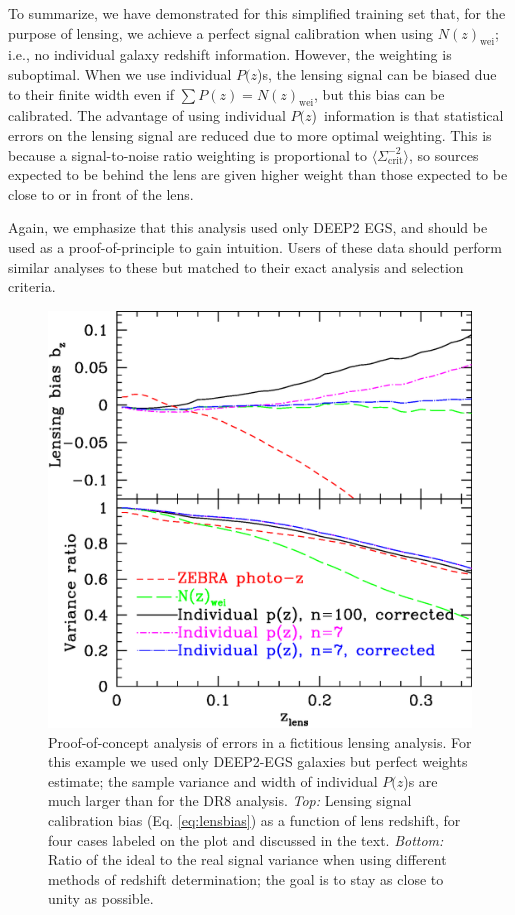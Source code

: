 \documentclass[12pt,preprint]{aastex}
\newcommand{\pofz}{$P(z$)}
\begin{document}
To summarize, we have demonstrated for this simplified training set that, for
the purpose of lensing, we achieve a perfect signal calibration when using
$N(z)_\mathrm{wei}$; i.e., no individual galaxy redshift information.  However,
the weighting is suboptimal.  When we use individual \pofz s, the lensing signal
can be biased due to their finite width even if $\sum P(z) =
N(z)_\mathrm{wei}$, but this bias can be calibrated.  The advantage of
using individual \pofz\ information is that statistical errors on the lensing
signal are reduced due to more optimal weighting.  This is because a
signal-to-noise ratio weighting is proportional to $\langle \Sigma_{\mathrm{crit}}^{-2}
\rangle$, so sources expected to be behind the lens are given higher weight
than those expected to be close to or in front of the lens.

Again, we emphasize that this analysis used only DEEP2 EGS, and should be used
as a proof-of-principle to gain intuition.  Users of these data should perform
similar analyses to these but matched to their exact analysis and selection
criteria.

\begin{figure} [h]\centering
    \includegraphics[scale=0.5]{figures/pz.egs.c3n7.paper.eps}

    \caption{ Proof-of-concept analysis of errors in a fictitious lensing
    analysis.  For this example we used only DEEP2-EGS galaxies but perfect
    weights estimate; the sample variance and width of individual \pofz s are
    much larger than for the DR8 analysis.  {\em Top:} Lensing signal
    calibration bias (Eq.  \ref{eq:lensbias}) as a function of lens redshift,
    for four  cases labeled on the plot and discussed in the text.  {\em
    Bottom:}  Ratio of the ideal to the real signal variance when using
    different  methods of redshift determination; the goal is to stay as close
    to unity as possible. \label{fig:simplebias}}

\end{figure}
\end{document}
